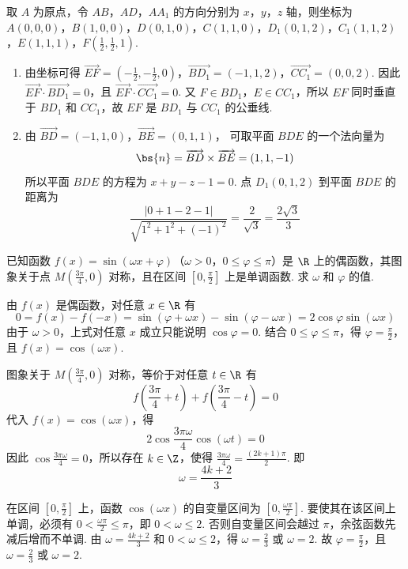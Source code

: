 \begin{solution}
取 \(A\) 为原点，令 \(AB\)，\(AD\)，\(AA_{1}\) 的方向分别为 \(x\)，\(y\)，\(z\) 轴，则坐标为 \(A(0,0,0)\)，\(B(1,0,0)\)，\(D(0,1,0)\)，\(C(1,1,0)\)，\(D_{1}(0,1,2)\)，\(C_{1}(1,1,2)\)，\(E(1,1,1)\)，\(F\left(\frac{1}{2},\frac{1}{2},1\right)\).

\begin{enumerate}
\item 由坐标可得 \(\overrightarrow{EF}=\left(-\frac{1}{2},-\frac{1}{2},0\right)\)，\(\overrightarrow{BD_{1}}=(-1,1,2)\)，\(\overrightarrow{CC_{1}}=(0,0,2)\). 因此 \(\overrightarrow{EF}\cdot\overrightarrow{BD_{1}}=0\)，且 \(\overrightarrow{EF}\cdot\overrightarrow{CC_{1}}=0\).
又 \(F\in BD_{1}\)，\(E\in CC_{1}\)，所以 \(EF\) 同时垂直于 \(BD_{1}\) 和 \(CC_{1}\)，故 \(EF\) 是 \(BD_{1}\) 与 \(CC_{1}\) 的公垂线.

\item 由 \(\overrightarrow{BD}=(-1,1,0)\)，\(\overrightarrow{BE}=(0,1,1)\)，
可取平面 \(BDE\) 的一个法向量为
\[
\bs{n}=\overrightarrow{BD}\times\overrightarrow{BE}=(1,1,-1)
\]
所以平面 \(BDE\) 的方程为 \(x+y-z-1=0\).
点 \(D_{1}(0,1,2)\) 到平面 \(BDE\) 的距离为
\[
\frac{|0+1-2-1|}{\sqrt{1^{2}+1^{2}+(-1)^{2}}}
=\frac{2}{\sqrt{3}}=\frac{2\sqrt{3}}{3}
\]
\end{enumerate}
\end{solution}

\begin{problem}
已知函数 \( f(x) = \sin (\omega x + \varphi) \)（\(\omega > 0\)，\(0 \leqslant \varphi \leqslant \pi\)）是 \(\R\) 上的偶函数，其图象关于点 \( M\left(\frac{3\pi}{4}, 0\right) \) 对称，且在区间 \(\left[0, \frac{\pi}{2}\right]\) 上是单调函数. 求 \(\omega\) 和 \(\varphi\) 的值.
\end{problem}

\begin{solution}
由 \(f(x)\) 是偶函数，对任意 \(x\in\R\) 有
\[
0=f(x)-f(-x)=\sin(\varphi+\omega x)-\sin(\varphi-\omega x)
=2\cos\varphi\sin(\omega x)
\]
由于 \(\omega>0\)，上式对任意 \(x\) 成立只能说明 \(\cos\varphi=0\). 结合 \(0\leqslant\varphi\leqslant\pi\)，得 \(\varphi=\frac{\pi}{2}\)，且 \(f(x)=\cos(\omega x)\).

图象关于 \(M\left(\frac{3\pi}{4},0\right)\) 对称，等价于对任意 \(t\in\R\) 有
\[
f\left(\frac{3\pi}{4}+t\right)+f\left(\frac{3\pi}{4}-t\right)=0
\]
代入 \(f(x)=\cos(\omega x)\)，得
\[
2\cos\frac{3\pi\omega}{4}\cos(\omega t)=0
\]
因此 \(\cos\frac{3\pi\omega}{4}=0\)，所以存在 \(k\in\Z\)，使得 \(\frac{3\pi\omega}{4}=\frac{(2k+1)\pi}{2}\).
即
\[
\omega=\frac{4k+2}{3}
\]

在区间 \(\left[0,\frac{\pi}{2}\right]\) 上，函数 \(\cos(\omega x)\) 的自变量区间为 \(\left[0,\frac{\omega\pi}{2}\right]\). 要使其在该区间上单调，必须有 \(0<\frac{\omega\pi}{2}\leqslant\pi\)，即 \(0<\omega\leqslant2\). 否则自变量区间会越过 \(\pi\)，余弦函数先减后增而不单调. 由 \(\omega=\frac{4k+2}{3}\) 和 \(0<\omega\leqslant2\)，得 \(\omega=\frac{2}{3}\) 或 \(\omega=2\). 故 \(\varphi=\frac{\pi}{2}\)，且 \(\omega=\frac{2}{3}\) 或 \(\omega=2\).
\end{solution}

